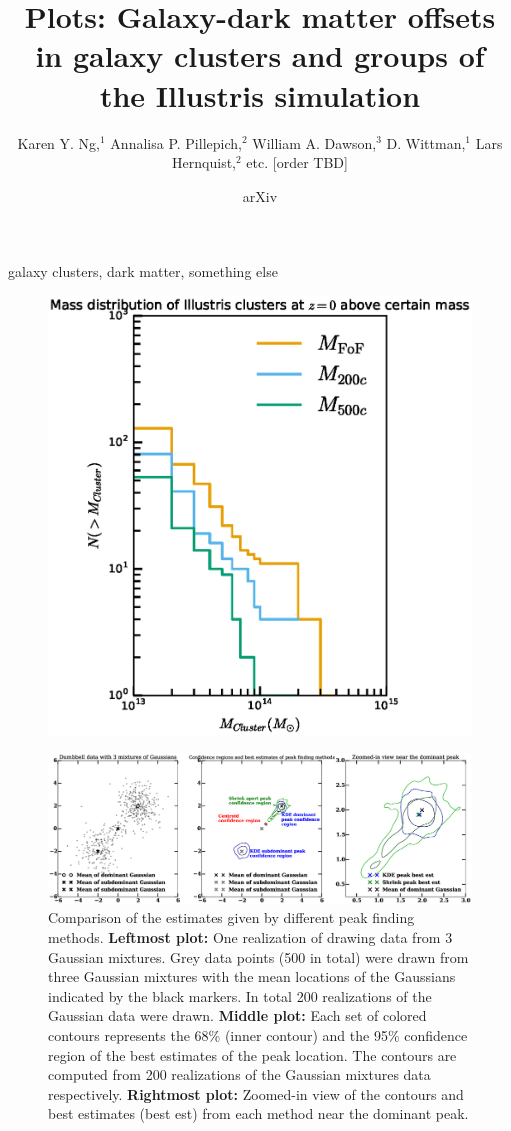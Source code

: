 \documentclass[letterpaper,useAMS,usenatbib]{mn2e}
\title[
	Galaxy-dark matter offsets in galaxy clusters and groups of the
Illustris simulation
]
{Plots: Galaxy-dark matter offsets in galaxy clusters and groups of the
Illustris simulation}
\author[Karen Y. Ng et al.]{Karen Y. Ng,$^{1}$
	Annalisa P. Pillepich,$^{2}$ 
	William A. Dawson,$^{3}$ 
	D. Wittman,$^{1}$
	\newauthor Lars Hernquist,$^{2}$
	etc. [order TBD]
}
\begin{document}
\date{arXiv} \pagerange{\pageref{firstpage}--\pageref{lastpage}}
 \maketitle\label{firstpage}
\begin{abstract} 
\end{abstract}
\begin{keywords}
	galaxy clusters, dark matter, something else 
\end{keywords}
\begin{figure}
	\includegraphics[width=.95\linewidth]{clusterMassDist.eps}
	\caption{
		\label{fig:config}}
\end{figure}
\begin{figure}
	\includegraphics[width=.95\linewidth]{confidence_regions_dumbbell_500.eps}
	\caption{Comparison of the estimates given by different peak finding methods.
		{\bf Leftmost plot:} One realization of drawing data from 3 Gaussian
		mixtures. Grey data points (500 in total) were drawn from three
		Gaussian mixtures with the mean locations of the Gaussians indicated by the
		black markers. In total 200 realizations of the Gaussian data were drawn.
		{\bf Middle plot:} Each set of colored contours represents the
		68\% (inner contour) and the 95\% confidence region of the best estimates
		of the peak location. The contours are computed from 200 realizations of the Gaussian
		mixtures data respectively. {\bf Rightmost plot:} Zoomed-in view of the
		contours and best estimates (best est) from each method near the dominant peak.  
		\label{fig:dumbbell500}}
\end{figure}
\clearpage\bsp\label{lastpage} 
\end{document}
